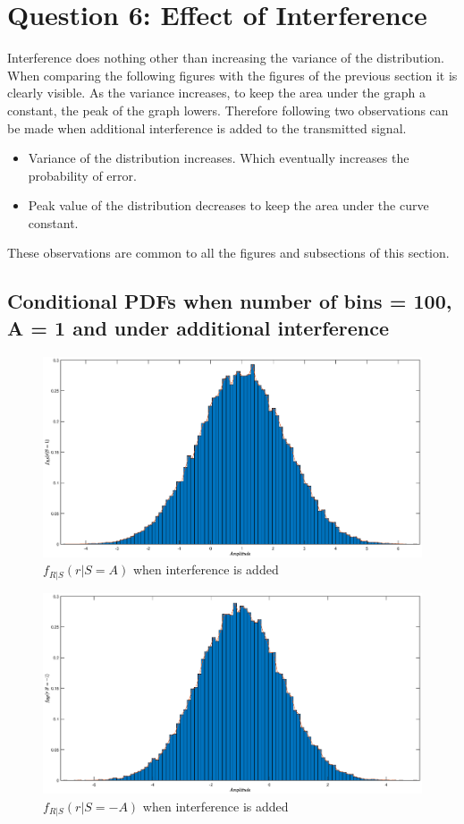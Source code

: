 \documentclass[a4paper,11pt]{article}%
\begin{document}
\pagebreak
\section{Question 6: Effect of Interference}

Interference does nothing other than increasing the variance of the  distribution. When comparing the following figures with the figures of the previous section it is clearly visible. As the variance increases, to keep the area under the graph  a constant, the peak of the graph lowers. Therefore following two observations can be made when additional interference is added to the transmitted signal.
\begin{itemize}
	\item Variance of the distribution increases. Which eventually increases the probability of error.
	\item Peak value of the distribution decreases to keep the area under the curve constant.
\end{itemize}

These observations are common to all the figures and subsections of this section.

\subsection{Conditional PDFs when number of bins = 100, A = 1 and under additional interference}

\begin{figure}[!h]
	\centering
	\includegraphics[scale=0.38]{figures/q6f1}
	\caption{$f_{R|S}(r|S=A)$ when interference is added}
\end{figure}

\begin{figure}[!h]
	\centering
	\includegraphics[scale=0.38]{figures/q6f2}
	\caption{$f_{R|S}(r|S= -A)$  when interference is added}
\end{figure}
\end{document}
